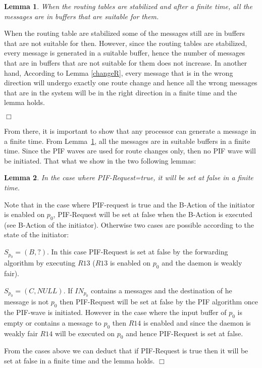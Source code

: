 \documentclass{llncs}
\renewenvironment{proof}{{\it Proof. } }{{\hfill $\Box$}\vspace{.5pc}}
\newtheorem{lem}{Lemma}
\begin{document}
\begin{lem}\label{SWBUF}
When the routing tables are stabilized and after a finite time, all the messages are in buffers that are suitable for them.
\end{lem}  

\begin{proof}
When the routing table are stabilized some of the messages still are in buffers that are not suitable for then. However, since the routing tables are stabilized, every message is generated in a suitable buffer, hence the number of 
messages that are in buffers that are not suitable for them does not increase. In another hand, According to Lemma \ref{changeR}, every message that is in the wrong direction will undergo exactly one route change and hence all the wrong messages that are in the system will be in the right direction in a finite time and the lemma holds. 

\end{proof}




 From there, it is important to show that any processor can generate a message in a finite time.  From
Lemma~\ref{SWBUF}, all the messages are in suitable buffers in a finite time.  Since the PIF waves are used for route
changes only, then no PIF wave will be initiated. That what we show in the two following lemmas:

\begin{lem}\label{PIFREQ}
In the case where PIF-Request=true, it will be set at false in a finite time.
\end{lem}  

\begin{proof}
Note that in the case where PIF-request is true and the B-Action of the initiator is enabled on $p_{0}$, PIF-Request will be set at false when the B-Action is executed (see B-Action of the initiator). Otherwise two cases are possible according to the state of the initiator:
\begin{itemize}
\item{$S_{p_{0}}=(B,?)$. In this case PIF-Request is set at false by the forwarding algorithm by executing $R13$ ($R13$ is enabled on $p_{0}$ and the daemon is weakly fair).
\item{$S_{p_{0}}=(C,NULL)$}. If $IN_{p_{0}}$ contains a messages and the destination of he message is not $p_{0}$ then PIF-Request will be set at false by the PIF algorithm once the PIF-wave is initiated. However in the case where the input buffer of $p_{0}$ is empty or contains a message to $p_{0}$ then $R14$ is enabled and since the daemon is weakly fair $R14$ will be executed on $p_{0}$ and hence PIF-Request is set at false.}
\end{itemize}
From the cases above we can deduct that if PIF-Request is true then it will be set at false in a finite time and the lemma holds.
\end{proof}
\end{document}
